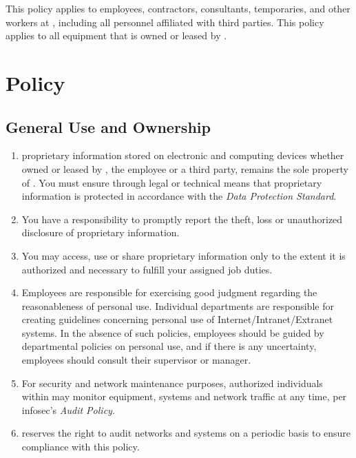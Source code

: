 This policy applies to employees, contractors, consultants, temporaries, and other workers at \CompanyName{}, including all personnel affiliated with third parties.  
This policy applies to all equipment that is owned or leased by \CompanyName{}.

\section{Policy}
\subsection{General Use and Ownership}
\begin{enumerate}
\item
\CompanyName{} proprietary information stored on electronic and computing devices whether owned or leased by \CompanyName{}, the employee or a third party, remains the sole property of \CompanyName{}.  
You must ensure through legal or technical means that proprietary information is protected in accordance with the \textsl{Data Protection Standard}.
\item
You have a responsibility to promptly report the theft, loss or unauthorized disclosure of \CompanyName{} proprietary information.
\item
You may access, use or share \CompanyName{} proprietary information only to the extent it is authorized and necessary to fulfill your assigned job duties.
\item
Employees are responsible for exercising good judgment regarding the reasonableness of personal use.  
Individual departments are responsible for creating guidelines concerning personal use of Internet/Intranet/Extranet systems.  
In the absence of such policies, employees should be guided by departmental policies on personal use, and if there is any uncertainty, employees should consult their supervisor or manager.
\item
For security and network maintenance purposes, authorized individuals within \CompanyName{} may monitor equipment, systems and network traffic at any time, per \gls{infosec}'s \textsl{Audit Policy}.%
\item
\CompanyName{} reserves the right to audit networks and systems on a periodic basis to ensure compliance with this policy.
\end{enumerate}
